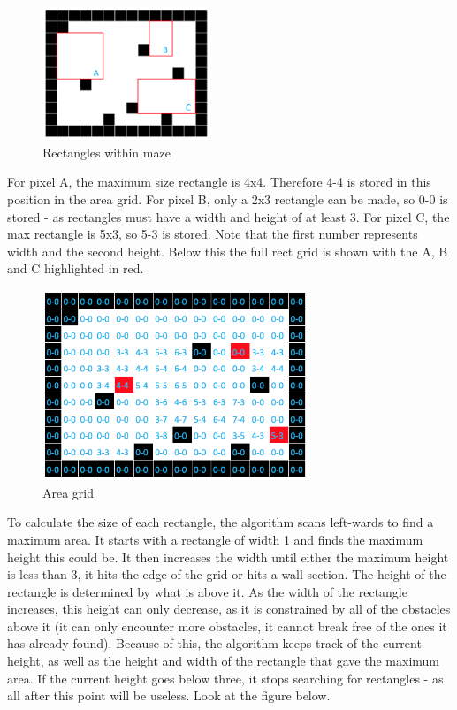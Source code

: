 \documentclass[titlepage]{article}
\begin{document}
\begin{figure}[H]
  \centering
  \includegraphics[width=5cm]{abcrect.png}
  \caption{Rectangles within maze}
  \label{fig:dijk}
\end{figure}

For pixel A, the maximum size rectangle is 4x4. Therefore 4-4 is stored in this position in the area grid. For pixel B, only a 2x3 rectangle can be made, so 0-0 is stored - as rectangles must have a width and height of at least 3. For pixel C, the max rectangle is 5x3, so 5-3 is stored. Note that the first number represents width and the second height. Below this the full rect grid is shown with the A, B and C highlighted in red.

\begin{figure}[H]
  \centering
  \includegraphics[width=8cm]{areagrid.png}
  \caption{Area grid}
  \label{fig:dijk}
\end{figure}

To calculate the size of each rectangle, the algorithm scans left-wards to find a maximum area. It starts with a rectangle of width 1 and finds the maximum height this could be. It then increases the width until either the maximum height is less than 3, it hits the edge of the grid or hits a wall section. The height of the rectangle is determined by what is above it. As the width of the rectangle increases, this height can only decrease, as it is constrained by all of the obstacles above it (it can only encounter more obstacles, it cannot break free of the ones it has already found). Because of this, the algorithm keeps track of the current height, as well as the height and width of the rectangle that gave the maximum area. If the current height goes below three, it stops searching for rectangles - as all after this point will be useless. Look at the figure below.
\end{document}
